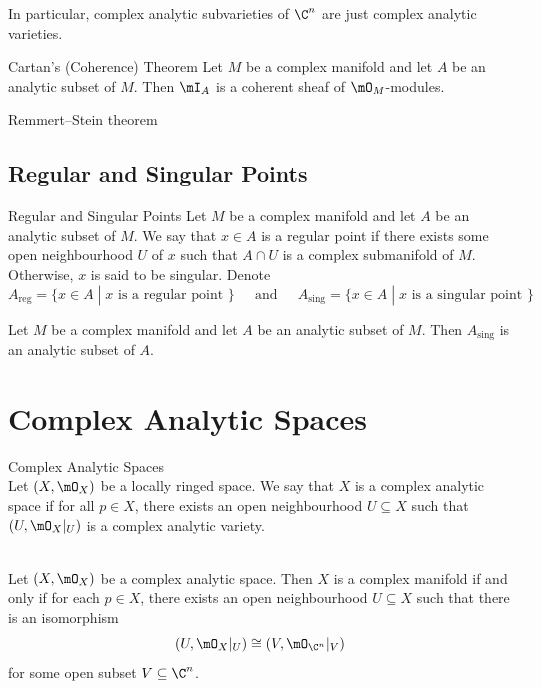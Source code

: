 \documentclass[a4paper]{article}
\begin{document}
In particular, complex analytic subvarieties of $\C^n$ are just complex analytic varieties. 

\begin{thm}{Cartan's (Coherence) Theorem}{} Let $M$ be a complex manifold and let $A$ be an analytic subset of $M$. Then $\mI_A$ is a coherent sheaf of $\mO_M$-modules. 
\end{thm}

\begin{thm}{Remmert–Stein theorem}{}
\end{thm}

\subsection{Regular and Singular Points}
\begin{defn}{Regular and Singular Points}{} Let $M$ be a complex manifold and let $A$ be an analytic subset of $M$. We say that $x\in A$ is a regular point if there exists some open neighbourhood $U$ of $x$ such that $A\cap U$ is a complex submanifold of $M$. Otherwise, $x$ is said to be singular. Denote $$A_\text{reg}=\{x\in A\;|\;x\text{ is a regular point }\}\;\;\;\;\text{ and }\;\;\;\; A_\text{sing}=\{x\in A\;|\;x\text{ is a singular point }\}$$
\end{defn}

\begin{thm}{}{} Let $M$ be a complex manifold and let $A$ be an analytic subset of $M$. Then $A_\text{sing}$ is an analytic subset of $A$. 
\end{thm}

\pagebreak
\section{Complex Analytic Spaces}
\begin{defn}{Complex Analytic Spaces}{}\\
Let $(X,\mO_X)$ be a locally ringed space. We say that $X$ is a complex analytic space if for all $p\in X$, there exists an open neighbourhood $U\subseteq X$ such that $(U,\mO_X|_U)$ is a complex analytic variety. 
\end{defn}

\begin{lmm}{}{}\\
Let $(X,\mO_X)$ be a complex analytic space. Then $X$ is a complex manifold if and only if for each $p\in X$, there exists an open neighbourhood $U\subseteq X$ such that there is an isomorphism $$(U,\mO_X|_U)\cong(V,\mO_{\C^n}|_V)$$ for some open subset $V\subseteq\C^n$. 
\end{lmm}
\end{document}
